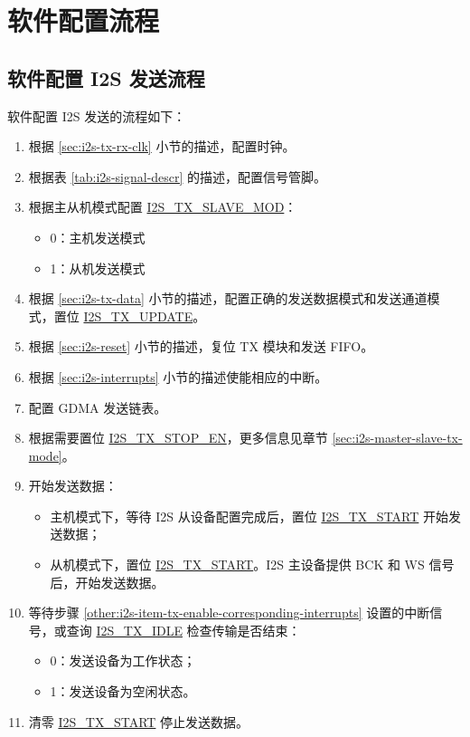 \documentclass[main\_\_CN.tex]{subfiles}
\begin{document}
\section{软件配置流程}
\subsection{软件配置 I2S 发送流程}\label{sec:i2s-configure-i2s-tx-mode}

软件配置 I2S 发送的流程如下：

\begin{enumerate}
    \item 根据 \ref{sec:i2s-tx-rx-clk} 小节的描述，配置时钟。
    \item 根据表 \ref{tab:i2s-signal-descr} 的描述，配置信号管脚。
    \item 根据主从机模式配置 \hyperref[fielddesc:I2STXSLAVEMOD]{I2S\_TX\_SLAVE\_MOD}：
    \begin{itemize}
        \item 0：主机发送模式
        \item 1：从机发送模式
    \end{itemize}
    \item 根据 \ref{sec:i2s-tx-data} 小节的描述，配置正确的发送数据模式和发送通道模式，置位 \hyperref[fielddesc:I2STXUPDATE]{I2S\_TX\_UPDATE}。
    \item 根据 \ref{sec:i2s-reset} 小节的描述，复位 TX 模块和发送 FIFO。
    \item 根据 \ref{sec:i2s-interrupts} 小节的描述使能相应的中断。\label{other:i2s-item-tx-enable-corresponding-interrupts}
    \item 配置 GDMA 发送链表。 
    \item 根据需要置位 \hyperref[fielddesc:I2STXSTOPEN]{I2S\_TX\_STOP\_EN}，更多信息见章节 \ref{sec:i2s-master-slave-tx-mode}。
    \item 开始发送数据：
    \begin{itemize}
        \item 主机模式下，等待 I2S 从设备配置完成后，置位 \hyperref[fielddesc:I2STXSTART]{I2S\_TX\_START} 开始发送数据；
        \item 从机模式下，置位 \hyperref[fielddesc:I2STXSTART]{I2S\_TX\_START}。I2S 主设备提供 BCK 和 WS 信号后，开始发送数据。
    \end{itemize}
    \item 等待步骤 \ref{other:i2s-item-tx-enable-corresponding-interrupts} 设置的中断信号，或查询 \hyperref[fielddesc:I2STXIDLE]{I2S\_TX\_IDLE} 检查传输是否结束：
    \begin{itemize}
        \item 0：发送设备为工作状态；
        \item 1：发送设备为空闲状态。
    \end{itemize}
    \item 清零 \hyperref[fielddesc:I2STXSTART]{I2S\_TX\_START} 停止发送数据。
\end{enumerate}
\end{document}
